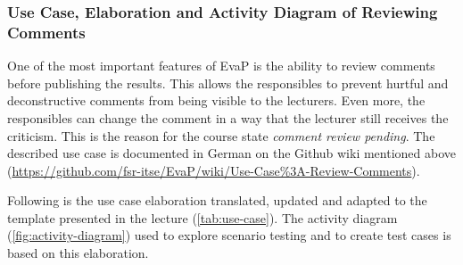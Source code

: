 \subsubsection{Use Case, Elaboration and Activity Diagram of Reviewing Comments}
One of the most important features of EvaP is the ability to review comments before publishing the results. 
This allows the responsibles to prevent hurtful and deconstructive comments from being visible to the lecturers.
Even more, the responsibles can change the comment in a way that the lecturer still receives the criticism.
This is the reason for the course state \emph{comment review pending}.
The described use case is documented in German on the Github wiki mentioned above 
(\url{https://github.com/fsr-itse/EvaP/wiki/Use-Case%3A-Review-Comments}).

Following is the use case elaboration translated, updated and adapted to the template presented in the lecture (\autoref{tab:use-case}).
The activity diagram (\autoref{fig:activity-diagram}) used to explore scenario testing and to create test cases is based on this elaboration.

